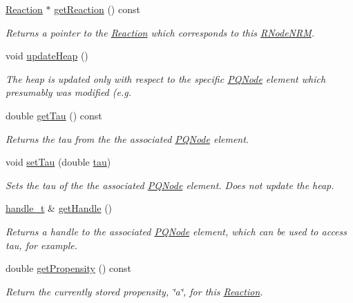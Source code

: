 \begin{DoxyCompactItemize}
\hyperlink{classchem_1_1Reaction}{Reaction} $\ast$ \hyperlink{classchem_1_1RNodeNRM_ab56b46ea4fdb4ed3cd3d9e478fbf3863}{get\-Reaction} () const 
\begin{DoxyCompactList}\small\item\em Returns a pointer to the \hyperlink{classchem_1_1Reaction}{Reaction} which corresponds to this \hyperlink{classchem_1_1RNodeNRM}{R\-Node\-N\-R\-M}. \end{DoxyCompactList}\item 
void \hyperlink{classchem_1_1RNodeNRM_a9de7334d3f16fc695929e97d9d296282}{update\-Heap} ()
\begin{DoxyCompactList}\small\item\em The heap is updated only with respect to the specific \hyperlink{classchem_1_1PQNode}{P\-Q\-Node} element which presumably was modified (e.\-g. \end{DoxyCompactList}\item 
double \hyperlink{classchem_1_1RNodeNRM_a570e4a825862fdf03d10e36fa186ba64}{get\-Tau} () const 
\begin{DoxyCompactList}\small\item\em Returns the tau from the the associated \hyperlink{classchem_1_1PQNode}{P\-Q\-Node} element. \end{DoxyCompactList}\item 
void \hyperlink{classchem_1_1RNodeNRM_aae070cd16c0acee98250c3d1bccd8fd0}{set\-Tau} (double \hyperlink{common_8h_abca55e6a21e0401c42bfb5da79ad3ad5}{tau})
\begin{DoxyCompactList}\small\item\em Sets the tau of the the associated \hyperlink{classchem_1_1PQNode}{P\-Q\-Node} element. Does not update the heap. \end{DoxyCompactList}\item 
\hyperlink{namespacechem_a33be80d87771bff54f5cede2e5d81cd1}{handle\-\_\-t} \& \hyperlink{classchem_1_1RNodeNRM_af5334e740100ba592f15abfe18b971a7}{get\-Handle} ()
\begin{DoxyCompactList}\small\item\em Returns a handle to the associated \hyperlink{classchem_1_1PQNode}{P\-Q\-Node} element, which can be used to access tau, for example. \end{DoxyCompactList}\item 
double \hyperlink{classchem_1_1RNodeNRM_a5894ae93a6ef48f7b0bfa82add5bce5d}{get\-Propensity} () const 
\begin{DoxyCompactList}\small\item\em Return the currently stored propensity, \char`\"{}a\char`\"{}, for this \hyperlink{classchem_1_1Reaction}{Reaction}. \end{DoxyCompactList}\item 

\end{DoxyCompactItemize}
